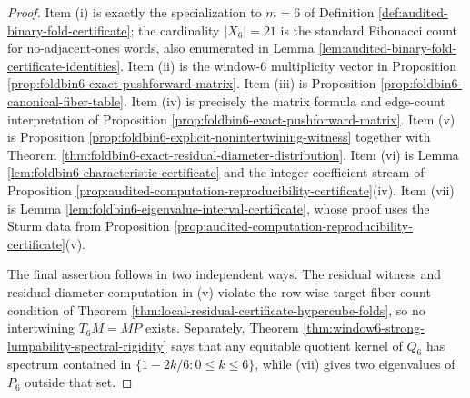 \begin{proof}
Item \textup{(i)} is exactly the specialization to \(m=6\) of Definition \ref{def:audited-binary-fold-certificate}; the cardinality \(|X_6|=21\) is the standard Fibonacci count for no-adjacent-ones words, also enumerated in Lemma \ref{lem:audited-binary-fold-certificate-identities}.  Item \textup{(ii)} is the window-\(6\) multiplicity vector in Proposition \ref{prop:foldbin6-exact-pushforward-matrix}.  Item \textup{(iii)} is Proposition \ref{prop:foldbin6-canonical-fiber-table}.  Item \textup{(iv)} is precisely the matrix formula and edge-count interpretation of Proposition \ref{prop:foldbin6-exact-pushforward-matrix}.  Item \textup{(v)} is Proposition \ref{prop:foldbin6-explicit-nonintertwining-witness} together with Theorem \ref{thm:foldbin6-exact-residual-diameter-distribution}.  Item \textup{(vi)} is Lemma \ref{lem:foldbin6-characteristic-certificate} and the integer coefficient stream of Proposition \ref{prop:audited-computation-reproducibility-certificate}\textup{(iv)}.  Item \textup{(vii)} is Lemma \ref{lem:foldbin6-eigenvalue-interval-certificate}, whose proof uses the Sturm data from Proposition \ref{prop:audited-computation-reproducibility-certificate}\textup{(v)}.

The final assertion follows in two independent ways.  The residual witness and residual-diameter computation in \textup{(v)} violate the row-wise target-fiber count condition of Theorem \ref{thm:local-residual-certificate-hypercube-folds}, so no intertwining \(T_6M=MP\) exists.  Separately, Theorem \ref{thm:window6-strong-lumpability-spectral-rigidity} says that any equitable quotient kernel of \(Q_6\) has spectrum contained in \(\{1-2k/6:0\le k\le6\}\), while \textup{(vii)} gives two eigenvalues of \(P_6\) outside that set. \qedhere
\end{proof}

